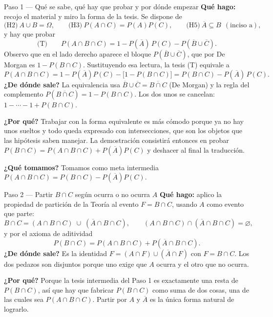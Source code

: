 \documentclass[11pt]{article}
\begin{document}
\begin{sol}
\begin{paso}{Paso 1 --- Qué se sabe, qué hay que probar y por dónde empezar}
\textbf{Qué hago:} recojo el material y miro la forma de la tesis. Se dispone de
\[
\text{(H2)}\ A\cup B=\Omega,\qquad
\text{(H3)}\ P(A\cap C)=P(A)P(C),\qquad
\text{(H5)}\ \overline{A}\subseteq B\ \ (\text{inciso a}),
\]
y hay que probar
\[
\text{(T)}\qquad
P(A\cap B\cap C)=1-P(\overline{A})\,P(C)-P(\overline{B}\cup\overline{C}).
\]
Observo que en el lado derecho aparece el bloque $P(\overline{B}\cup\overline{C})$, que por De
Morgan es $1-P(B\cap C)$. Sustituyendo esa lectura, la tesis (T) equivale a
\[
P(A\cap B\cap C)=1-P(\overline{A})P(C)-\bigl[1-P(B\cap C)\bigr]
=P(B\cap C)-P(\overline{A})\,P(C).
\]
\textbf{¿De dónde sale?} La equivalencia usa
$\overline{B}\cup\overline{C}=\overline{B\cap C}$ (De Morgan) y la regla del complemento
$P(\overline{B\cap C})=1-P(B\cap C)$. Los dos unos se cancelan: $1-\cdots-1+P(B\cap C)$.

\textbf{¿Por qué?} Trabajar con la forma equivalente es más cómodo porque ya no hay unos
sueltos y todo queda expresado con intersecciones, que son los objetos que las hipótesis saben
manejar. La demostración consistirá entonces en probar
$P(B\cap C)=P(A\cap B\cap C)+P(\overline{A})P(C)$ y deshacer al final la traducción.

\textbf{¿Qué tomamos?} Tomamos como meta intermedia
$P(A\cap B\cap C)=P(B\cap C)-P(\overline{A})P(C)$.
\end{paso}

\begin{paso}{Paso 2 --- Partir $B\cap C$ según ocurra o no ocurra $A$}
\textbf{Qué hago:} aplico la propiedad de partición de la Teoría al evento $F=B\cap C$,
usando $A$ como evento que parte:
\[
B\cap C=(A\cap B\cap C)\;\cup\;(\overline{A}\cap B\cap C),
\qquad
(A\cap B\cap C)\cap(\overline{A}\cap B\cap C)=\varnothing,
\]
y por el axioma de aditividad
\[
P(B\cap C)=P(A\cap B\cap C)+P(\overline{A}\cap B\cap C).
\]
\textbf{¿De dónde sale?} Es la identidad $F=(A\cap F)\cup(\overline{A}\cap F)$ con
$F=B\cap C$. Los dos pedazos son disjuntos porque uno exige que $A$ ocurra y el otro que no
ocurra.

\textbf{¿Por qué?} Porque la tesis intermedia del Paso 1 es exactamente una resta de
$P(B\cap C)$, así que hay que fabricar $P(B\cap C)$ como suma de dos cosas, una de las cuales
sea $P(A\cap B\cap C)$. Partir por $A$ y $\overline{A}$ es la única forma natural de lograrlo.


\end{paso}
\end{sol}
\end{document}
